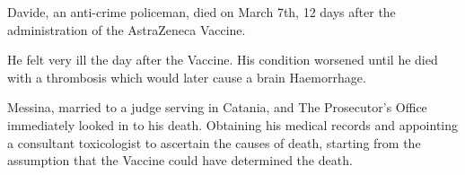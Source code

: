 Davide, an anti-crime policeman, died on March 7th, 12 days after the
administration of the AstraZeneca Vaccine.

He felt very ill the day after the Vaccine. His condition worsened until he died
with a thrombosis which would later cause a brain Haemorrhage.

Messina, married to a judge serving in Catania, and The Prosecutor’s Office
immediately looked in to his death. Obtaining his medical records and appointing
a consultant toxicologist to ascertain the causes of death, starting from the
assumption that the Vaccine could have determined the death.

